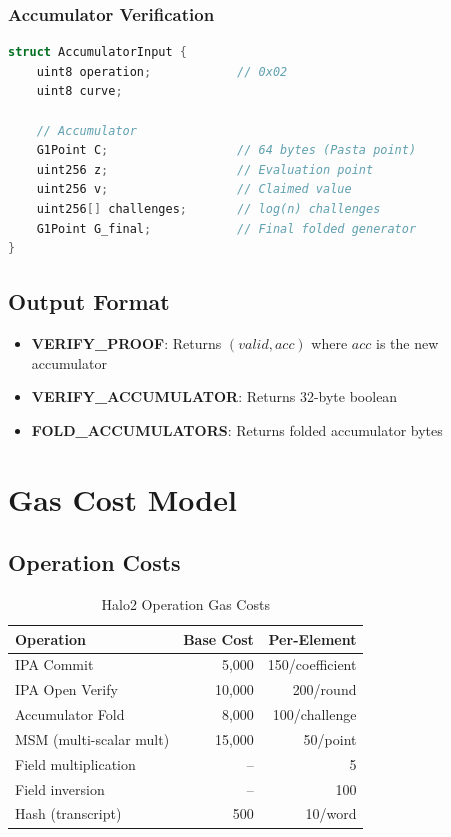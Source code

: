 \documentclass[11pt,a4paper]{article}
\theoremstyle{definition}
\begin{document}
\subsubsection{Accumulator Verification}

\begin{lstlisting}[language=C]
struct AccumulatorInput {
    uint8 operation;            // 0x02
    uint8 curve;

    // Accumulator
    G1Point C;                  // 64 bytes (Pasta point)
    uint256 z;                  // Evaluation point
    uint256 v;                  // Claimed value
    uint256[] challenges;       // log(n) challenges
    G1Point G_final;            // Final folded generator
}
\end{lstlisting}

\subsection{Output Format}

\begin{itemize}
    \item \textbf{VERIFY\_PROOF}: Returns $(valid, acc)$ where $acc$ is the new accumulator
    \item \textbf{VERIFY\_ACCUMULATOR}: Returns 32-byte boolean
    \item \textbf{FOLD\_ACCUMULATORS}: Returns folded accumulator bytes
\end{itemize}

\section{Gas Cost Model}

\subsection{Operation Costs}

\begin{table}[h]
\centering
\caption{Halo2 Operation Gas Costs}
\begin{tabular}{lrr}
\toprule
Operation & Base Cost & Per-Element \\
\midrule
IPA Commit & 5,000 & 150/coefficient \\
IPA Open Verify & 10,000 & 200/round \\
Accumulator Fold & 8,000 & 100/challenge \\
MSM (multi-scalar mult) & 15,000 & 50/point \\
Field multiplication & -- & 5 \\
Field inversion & -- & 100 \\
Hash (transcript) & 500 & 10/word \\
\bottomrule
\end{tabular}
\end{table}
\end{document}
